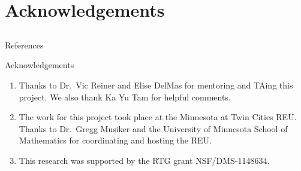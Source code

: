 \documentclass{beamer}
\theoremstyle{remark}
\newcommand\rk{\operatorname{rk}}
\begin{document}



\section{Acknowledgements}
\subsection{}

\begin{frame}{References}
\nocite{quotients_stanley}
\nocite{algebraic_stanley}
\nocite{pak}


\end{frame}


\begin{frame}{Acknowledgements}
\begin{enumerate}
\item Thanks to Dr.\ Vic Reiner and Elise DelMas for mentoring and TAing this project. We also thank Ka Yu Tam for helpful comments. 
\item The work for this project took place at the Minnesota at Twin Cities REU.  Thanks to Dr.\ Gregg Musiker and the University of Minnesota School of Mathematics for coordinating and hosting the REU.
\item This research was supported by the RTG grant NSF/DMS-1148634.
\end{enumerate}
\end{frame}
\end{document}
